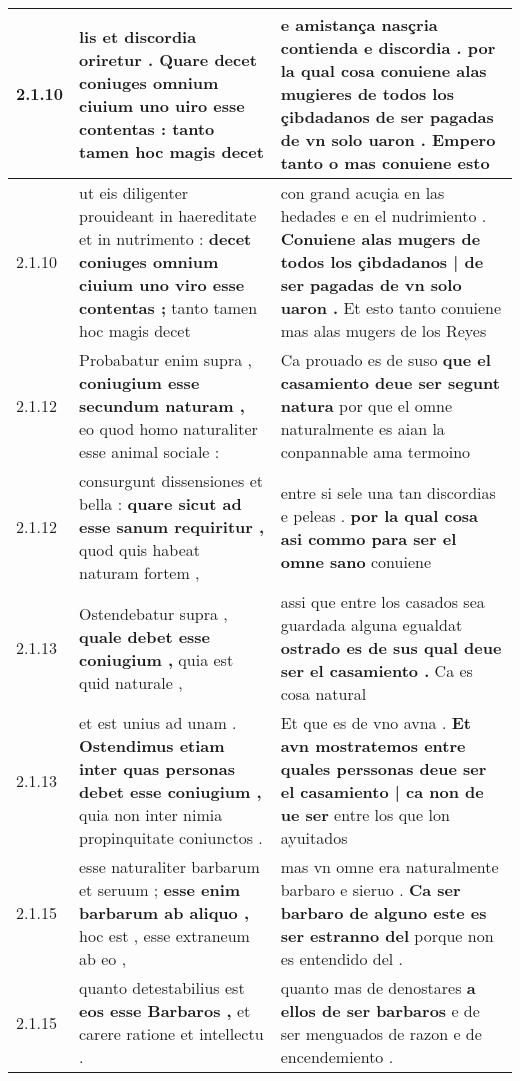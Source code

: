 \begin{tabular}{|p{1cm}|p{6.5cm}|p{6.5cm}|}
2.1.10 & lis et discordia oriretur . \textbf{ Quare decet coniuges omnium ciuium uno uiro esse contentas : } tanto tamen hoc magis decet & e amistança nasçria contienda e discordia . \textbf{ por la qual cosa conuiene alas mugieres de todos los çibdadanos de ser pagadas de vn solo uaron . } Empero tanto o mas conuiene esto \\\hline
2.1.10 & ut eis diligenter prouideant in haereditate et in nutrimento : \textbf{ decet coniuges omnium ciuium uno viro esse contentas ; } tanto tamen hoc magis decet & con grand acuçia en las hedades e en el nudrimiento . \textbf{ Conuiene alas mugers de todos los çibdadanos | de ser pagadas de vn solo uaron . } Et esto tanto conuiene mas alas mugers de los Reyes \\\hline
2.1.12 & Probabatur enim supra , \textbf{ coniugium esse secundum naturam , } eo quod homo naturaliter esse animal sociale : & Ca prouado es de suso \textbf{ que el casamiento deue ser segunt natura } por que el omne naturalmente es aian la conpannable ama termoino \\\hline
2.1.12 & consurgunt dissensiones et bella : \textbf{ quare sicut ad esse sanum requiritur , } quod quis habeat naturam fortem , & entre si sele una tan discordias e peleas . \textbf{ por la qual cosa asi commo para ser el omne sano } conuiene \\\hline
2.1.13 & Ostendebatur supra , \textbf{ quale debet esse coniugium , } quia est quid naturale , & assi que entre los casados sea guardada alguna egualdat \textbf{ ostrado es de sus qual deue ser el casamiento . } Ca es cosa natural \\\hline
2.1.13 & et est unius ad unam . \textbf{ Ostendimus etiam inter quas personas debet esse coniugium , } quia non inter nimia propinquitate coniunctos . & Et que es de vno avna . \textbf{ Et avn mostratemos entre quales perssonas deue ser el casamiento | ca non de ue ser } entre los que lon ayuitados \\\hline
2.1.15 & esse naturaliter barbarum et seruum ; \textbf{ esse enim barbarum ab aliquo , } hoc est , esse extraneum ab eo , & mas vn omne era naturalmente barbaro e sieruo . \textbf{ Ca ser barbaro de alguno este es ser estranno del } porque non es entendido del . \\\hline
2.1.15 & quanto detestabilius est \textbf{ eos esse Barbaros , } et carere ratione et intellectu . & quanto mas de denostares \textbf{ a ellos de ser barbaros } e de ser menguados de razon e de encendemiento . \\\hline

\end{tabular}

